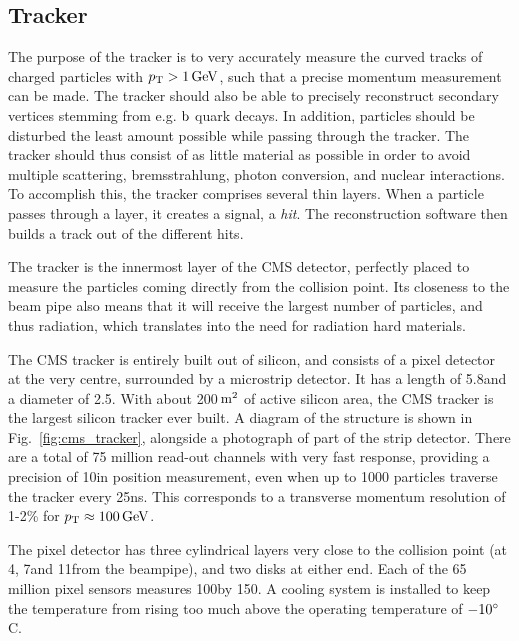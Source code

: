 \subsection{Tracker \label{sec:cms_tracker}}

The purpose of the tracker is to very accurately measure the curved tracks of charged
particles with $\pt > 1\GeV$, such that a precise momentum measurement can be made. 
The tracker should also be able to precisely reconstruct secondary
vertices stemming from e.g. $\cPqb$ quark decays. 
In addition, particles should be disturbed the least amount possible while passing through the
tracker. The tracker should thus consist of as little material as possible in order to avoid
multiple scattering, bremsstrahlung, photon conversion, and nuclear interactions.
To accomplish this, the tracker comprises several thin layers. When a particle passes
through a layer, it creates a signal, a \textit{hit}. The reconstruction software then builds a
track out of the different hits. 

The tracker is the innermost layer of the CMS detector, perfectly placed to measure the particles
coming directly from the collision point. Its closeness to the beam pipe also means that it will
receive the largest number of particles, and thus radiation, which translates into the need for
radiation hard materials. 

The CMS tracker is entirely built out of silicon, and consists of a pixel detector at the very
centre, surrounded by a microstrip detector. It has a length of 5.8\meter and a diameter of
2.5\meter. With about 200$\meter^\text{2}$ of active silicon area, the CMS tracker is the largest
silicon tracker ever built. A diagram of the structure is shown in
Fig.~\ref{fig:cms_tracker}, alongside a photograph of part of the strip detector. 
There are a total of 75 million read-out channels with very fast response, providing a precision of
10\mum in position measurement, even when up to 1000 particles traverse the tracker every
25\unit{ns}. This corresponds to a transverse momentum resolution of 1-2\% for $\pt \approx
100\GeV$. 

The pixel detector has three cylindrical layers very close to the collision point (at 4\cm, 7\cm and
11\cm from the beampipe), and two disks at either end. Each of the 65 million pixel sensors measures
100\mum by 150\mum. A cooling system is installed to keep the temperature from rising too much
above the operating temperature of $-10\de$C.

